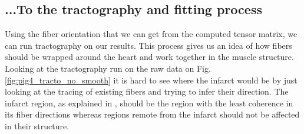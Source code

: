 \subsection{...To the tractography and fitting process}

Using the fiber orientation that we can get from the computed tensor matrix, we can run tractography on our results. This process gives us an idea of how fibers should be wrapped around the heart and work together in the muscle structure. Looking at the tractography run on the raw data on Fig. \ref{fig:pig4_tracto_no_smooth} it is hard to see where the infarct would be by just looking at the tracing of existing fibers and trying to infer their direction. The infarct region, as explained in \cite{wu2007mr}, should be the region with the least coherence in its fiber directions whereas regions remote from the infarct should not be affected in their structure.

